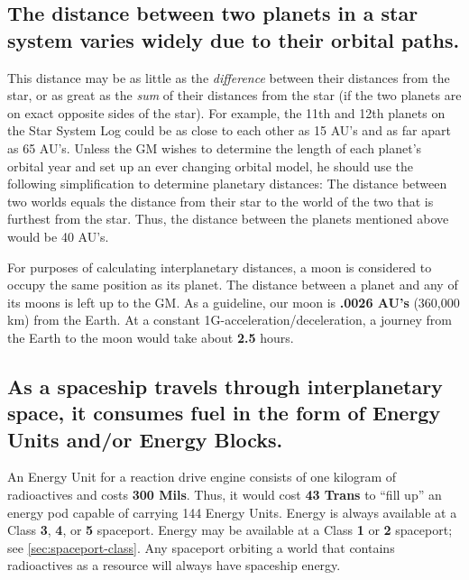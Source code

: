 \subsection[Distance Between Planets]{The distance between two
  planets in a star system 
  varies widely due to their orbital paths.}
\label{sec:distance-between-planets}



This distance may be as little as the \emph{difference} between their
distances from the star, or as great as the \emph{sum} of their distances
from the star (if the two planets are on exact opposite sides of the
star). For example, the 11th and 12th planets on the Star System Log
could be as close to each other as 15 AU's and as far apart as 65
AU's. Unless the GM wishes to determine the length of each planet's
orbital year and set up an ever changing orbital model, he should use
the following simplification to determine planetary distances: The
distance between two worlds equals the distance from their star to the
world of the two that is furthest from the star. Thus, the distance
between the planets mentioned above would be 40 AU's.

For purposes of calculating interplanetary distances, a moon is
considered to occupy the same position as its planet. The distance
between a planet and any of its moons is left up to the GM. As a
guideline, our moon is \textbf{.0026 AU's} (360,000 km) from the
Earth. At a constant 1G-acceleration/deceleration, a journey from the
Earth to the moon would take about \textbf{2.5} hours.



\subsection[Energy Units and Energy Blocks]{As a spaceship travels
  through interplanetary space, it 
  consumes fuel in the form of Energy Units and/or  
  Energy Blocks.}
\label{sec:energy-blocks}



An Energy Unit for a reaction drive engine consists of one kilogram of
radioactives and costs \textbf{300 Mils}. Thus, it would cost
\textbf{43 Trans} to ``fill up'' an energy pod capable of carrying 144
Energy Units. Energy is always available at a Class \textbf{3},
\textbf{4}, or \textbf{5} spaceport. Energy may be available at a
Class \textbf{1} or \textbf{2} spaceport; see
\ref{sec:spaceport-class}. Any spaceport orbiting a world that
contains radioactives as a resource will always have spaceship energy.


